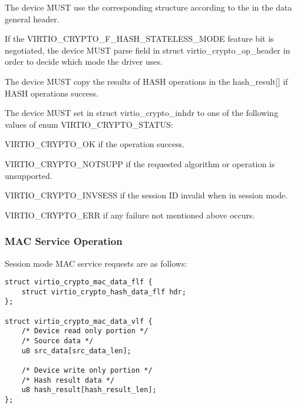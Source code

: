 
\begin{itemize*}
\item The device MUST use the corresponding structure according to the 
    in the data general header.
\item If the VIRTIO_CRYPTO_F_HASH_STATELESS_MODE feature bit is negotiated, the device
    MUST parse  field in struct virtio_crypto_op_header in order to decide
    which mode the driver uses.
\item The device MUST copy the results of HASH operations in the hash_result[] if HASH
    operations success.
\item The device MUST set  in struct virtio_crypto_inhdr to one of the
    following values of enum VIRTIO_CRYPTO_STATUS:
\begin{itemize*}
\item VIRTIO_CRYPTO_OK if the operation success.
\item VIRTIO_CRYPTO_NOTSUPP if the requested algorithm or operation is unsupported.
\item VIRTIO_CRYPTO_INVSESS if the session ID invalid when in session mode.
\item VIRTIO_CRYPTO_ERR if any failure not mentioned above occurs.
\end{itemize*}
\end{itemize*}


\subsubsection{MAC Service Operation}\label{sec:Device Types / Crypto Device / Device Operation / MAC Service Operation}

Session mode MAC service requests are as follows:

\begin{lstlisting}
struct virtio_crypto_mac_data_flf {
    struct virtio_crypto_hash_data_flf hdr;
};

struct virtio_crypto_mac_data_vlf {
    /* Device read only portion */
    /* Source data */
    u8 src_data[src_data_len];

    /* Device write only portion */
    /* Hash result data */
    u8 hash_result[hash_result_len];
};
\end{lstlisting}

